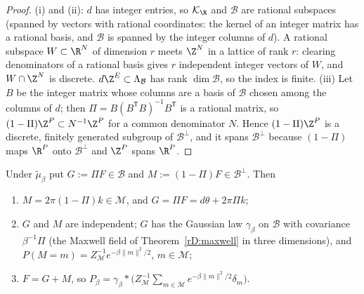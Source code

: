 \begin{proof}
(i) and (ii): $d$ has integer entries, so $\mathcal K_\R$ and $\mathcal B$
are rational subspaces (spanned by vectors with rational coordinates:
the kernel of an integer matrix has a rational basis, and $\mathcal B$ is
spanned by the integer columns of $d$). A rational subspace $W\subset\R^N$
of dimension $r$ meets $\Z^N$ in a lattice of rank $r$: clearing
denominators of a rational basis gives $r$ independent integer vectors
of $W$, and $W\cap\Z^N$ is discrete. $d\Z^E\subset\Lambda_{\mathcal B}$ has
rank $\dim\mathcal B$, so the index is finite. (iii) Let $B$ be the integer matrix whose columns are a basis of
$\mathcal B$ chosen among the columns of $d$; then $\Pi=B(B^{\mathsf T}B)
^{-1}B^{\mathsf T}$ is a rational matrix, so $(1-\Pi)\Z^P\subset N^{-1}
\Z^P$ for a common denominator $N$. Hence $(1-\Pi)\Z^P$ is a discrete,
finitely generated subgroup of $\mathcal B^\perp$, and it spans
$\mathcal B^\perp$ because $(1-\Pi)$ maps $\R^P$ onto $\mathcal B^\perp$
and $\Z^P$ spans $\R^P$.
\end{proof}

\begin{proposition}\label{rM3:lawF}
Under $\tilde\mu_\beta$ put $G:=\Pi F\in\mathcal B$ and $M:=(1-\Pi)F\in
\mathcal B^\perp$. Then
\begin{enumerate}[label=\textup{(\roman*)},leftmargin=*]
\item $M=2\pi(1-\Pi)k\in\mathcal M$, and $G=\Pi F=d\theta+2\pi\Pi k$;
\item $G$ and $M$ are independent; $G$ has the Gaussian law $\gamma_\beta$
on $\mathcal B$ with covariance $\beta^{-1}\Pi$ (the Maxwell field of
Theorem~\ref{rD:maxwell} in three dimensions), and
$P(M=m)=Z_{\mathcal M}^{-1}e^{-\beta\lVert m\rVert^2/2}$, $m\in\mathcal M$;
\item $F=G+M$, so $P_\beta=\gamma_\beta*\bigl(Z_{\mathcal M}^{-1}
\sum_{m\in\mathcal M}e^{-\beta\lVert m\rVert^2/2}\delta_m\bigr)$.
\end{enumerate}
\end{proposition}

